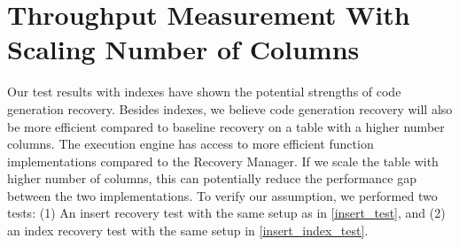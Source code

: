 \documentclass[12pt]{cmuthesis}
\begin{document}
\section{Throughput Measurement With Scaling Number of Columns}
Our test results with indexes have shown the potential strengths of code generation recovery. Besides indexes, we believe code generation recovery will also be more efficient compared to baseline recovery on a table with a higher number columns. The execution engine has access to more efficient function implementations compared to the Recovery Manager. If we scale the table with higher number of columns, this can potentially reduce the performance gap between the two implementations. To verify our assumption, we performed two tests: (1) An insert recovery test with the same setup as in \cref{insert_test}, and (2) an index recovery test with the same setup in \cref{insert_index_test}.
\end{document}

